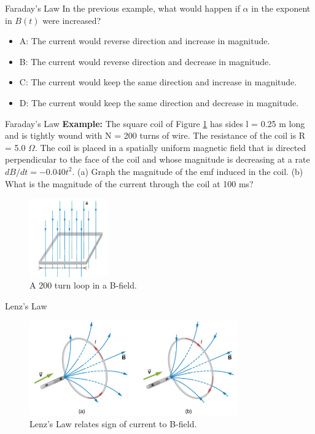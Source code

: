 \documentclass{beamer}
\begin{document}
\begin{frame}{Faraday's Law}
In the previous example, what would happen if $\alpha$ in the exponent in $B(t)$ were increased?
\begin{itemize}
\item A: The current would reverse direction and increase in magnitude.
\item B: The current would reverse direction and decrease in magnitude.
\item C: The current would keep the same direction and increase in magnitude.
\item D: The current would keep the same direction and decrease in magnitude.
\end{itemize}
\end{frame}

\begin{frame}{Faraday's Law}
\small
\textbf{Example:}
The square coil of Figure \ref{fig:loop2} has sides l = 0.25 m long and is tightly wound with N = 200 turns of wire. The resistance of the coil is R = 5.0 $\Omega$. The coil is placed in a spatially uniform magnetic field that is directed perpendicular to the face of the coil and whose magnitude is decreasing at a rate $dB/dt = −0.040 t^2$. (a) Graph the magnitude of the emf induced in the coil. (b) What is the magnitude of the current through the coil at 100 ms?
\begin{figure}
\centering
\includegraphics[width=0.3\textwidth]{figures/loop1.png}
\caption{\label{fig:loop2} A 200 turn loop in a B-field.}
\end{figure}
\end{frame}

\begin{frame}{Lenz's Law}
\begin{figure}
\centering
\includegraphics[width=0.8\textwidth]{figures/lenz.png}
\caption{\label{fig:loop3} Lenz's Law relates sign of current to B-field.}
\end{figure}
\end{frame}
\end{document}
